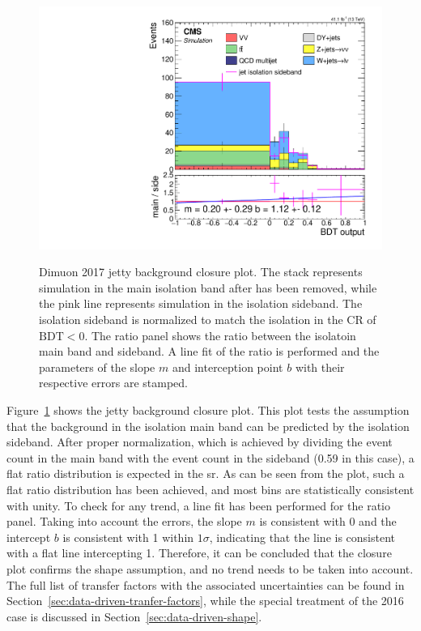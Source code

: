 \begin{figure}[!htb]
\centering
\includegraphics[width=0.60\linewidth]{plots/dilepton_muons_2017_closure/none_closure_dilepBDTphase1CorrJetNoMultIso10Dr0.6.pdf}  \\


\caption[Dimuon 2017 jetty background closure plot]{Dimuon 2017 jetty background closure plot. The stack represents simulation in the main isolation band after \ztautau has been removed, while the pink line represents simulation in the isolation sideband. The isolation sideband is normalized to match the isolation in the CR of $\mathrm{BDT} < 0$. The ratio panel shows the ratio between the isolatoin main band and sideband. A line fit of the ratio is performed and the parameters of the slope $m$ and interception point $b$ with their respective errors are stamped.}
\label{fig:dimuon-bdt-jetty-2017-closure}
\end{figure}

Figure~\ref{fig:dimuon-bdt-jetty-2017-closure} shows the jetty background closure plot. This plot tests the assumption that the background in the isolation main band can be predicted by the isolation sideband. After proper normalization, which is achieved by dividing the event count in the main band with the event count in the sideband (0.59 in this case), a flat ratio distribution is expected in the \gls{sr}. As can be seen from the plot, such a flat ratio distribution has been achieved, and most bins are statistically consistent with unity. To check for any trend, a line fit has been performed for the ratio panel. Taking into account the errors, the slope $m$ is consistent with 0 and the intercept $b$ is consistent with 1 within $1\sigma$, indicating that the line is consistent with a flat line intercepting 1. Therefore, it can be concluded that the closure plot confirms the shape assumption, and no trend needs to be taken into account. The full list of transfer factors with the associated uncertainties can be found in Section~\ref{sec:data-driven-tranfer-factors}, while the special treatment of the 2016 case is discussed in Section~\ref{sec:data-driven-shape}.

